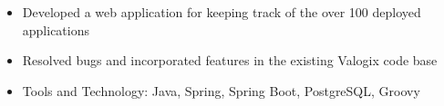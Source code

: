 \begin{itemize}
    \setlength\itemsep{0pt}
    \setlength{\parskip}{0pt}
    \item Developed a web application for keeping track of the over 100 deployed applications
    \item Resolved bugs and incorporated features in the existing Valogix code base
    \item Tools and Technology: Java, Spring, Spring Boot, PostgreSQL, Groovy
\end{itemize}
